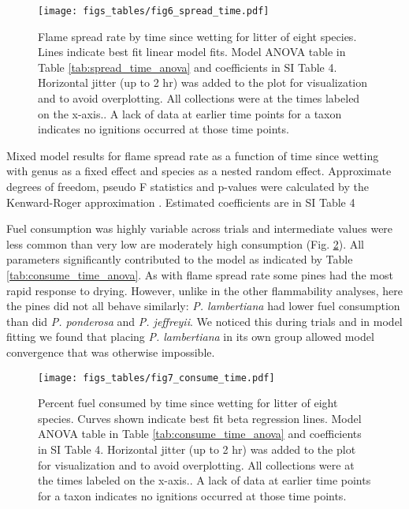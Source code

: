 \documentclass[fire,article,submit,moreauthors,pdftex]{Definitions/mdpi}
\begin{document}
\begin{figure}[H]
  \centering
\texttt{[image: figs\_tables/fig6\_spread\_time.pdf]}
\caption{Flame spread rate by time since wetting for litter of eight species.
  Lines indicate best fit linear model fits. Model ANOVA table in Table
  \ref{tab:spread_time_anova} and coefficients in SI Table 4. Horizontal
  jitter (up to 2 hr) was added to the plot for visualization and to avoid
  overplotting. All collections were at the times labeled on the x-axis.. A
  lack of data at earlier time points for a taxon indicates no ignitions
  occurred at those time points.}
  \label{fig:spread_time}
\end{figure}


\begin{table}[H]
  \caption[Mixed linear model of flame spread rate.]{Mixed model results for flame spread rate  as a function of time since wetting with genus as a fixed effect and species as a nested random effect. Approximate degrees of freedom, pseudo F statistics and p-values were calculated by the Kenward-Roger approximation \cite{Kenward_Roger-1997}. Estimated coefficients are in SI Table 4}
  \label{tab:spread_time_anova}
\centering

\end{table}

Fuel consumption was highly variable across trials and intermediate values were less common than very low are moderately high consumption (Fig. \ref{fig:spread_time}). All parameters significantly contributed to the model as indicated by Table \ref{tab:consume_time_anova}. As with flame spread rate some pines had the most rapid response to drying. However, unlike in the other flammability analyses, here the pines did not all behave similarly: \emph{P. lambertiana} had lower fuel consumption than did \emph{P. ponderosa} and \emph{P. jeffreyii}. We noticed this during trials and in model fitting we found that placing \emph{P. lambertiana} in its own group allowed model convergence that was otherwise impossible.

\begin{figure}[H]
  \centering
\texttt{[image: figs\_tables/fig7\_consume\_time.pdf]}
\caption{Percent fuel consumed by time since wetting for litter of eight
  species. Curves shown indicate best fit beta regression lines. Model ANOVA
  table in Table \ref{tab:consume_time_anova} and coefficients in SI Table
  4. Horizontal jitter (up to 2 hr) was added to the plot for visualization and
  to avoid overplotting. All collections were at the times labeled on the
  x-axis.. A lack of data at earlier time points for a taxon indicates no
  ignitions occurred at those time points.}
  \label{fig:spread_time}
\end{figure}
\end{document}
